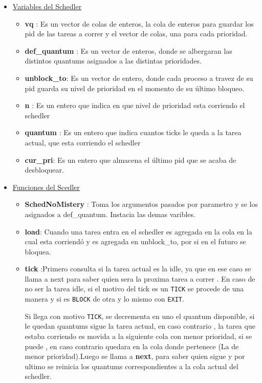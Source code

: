 	\begin{itemize}
		\item \underline{Variables del Schedler}
			\begin{itemize}
				\item \textbf{vq} : Es un vector de colas de enteros, la cola de enteros para guardar los pid de las tareas a correr y el vector de colas, una para cada prioridad.
				\item \textbf{def\_quantum} : Es un vector de enteros, donde se albergaran las distintos quantums 	asignados a las distintas prioridades.
				\item \textbf{unblock\_to}: Es un vector de entero, donde cada proceso a travez de su pid guarda su nivel de prioridad en el momento de su último bloqueo.
				\item \textbf{n} : Es un entero que indica en que nivel de prioridad esta corriendo el schedler
				\item \textbf{quantum} : Es un entero que indica cuantos ticks le queda a la tarea actual, que 	esta corriendo el schedler
				\item \textbf{cur\_pri}: Es un entero que almacena el último pid que se acaba de desbloquear.
			\end{itemize}
		\item \underline{Funciones del Scedler}
			\begin{itemize}
				\item \textbf{SchedNoMistery} : Toma los argumentos pasados por parametro y se los 			asignados a def\_quantum. Instacia las demas varibles.
				\item \textbf{load}: Cuando una tarea entra en el schedler es agregada en la cola en la 	cual esta corriendó y es agregada en unblock\_to, por si en el futuro se bloquea.
				\item \textbf{tick} :Primero consulta si la tarea actual es la idle, ya que
					en ese caso se llama a next para saber quien sera la proxima tarea a correr
					. En caso de no ser la tarea idle, si el motivo del tick es un \texttt{TICK} se procede de una
					manera y si es \texttt{BLOCK} de otra y lo mismo con \texttt{EXIT}. 
					
					Si llega con motivo \texttt{TICK}, se decrementa en uno el quantum disponible, si le quedan quantums sigue la tarea actual, en caso contrario , la tarea que estaba corriendo es movida a la siguiente cola con menor prioridad, si se puede , en caso contrario quedara en la cola donde pertenece (La de menor prioridad).Luego se llama a \textbf{next}, para saber quien sigue y por ultimo se reinicia los quantums correspondientes a la cola actual del schedler.
					

\end{itemize}
\end{itemize}
